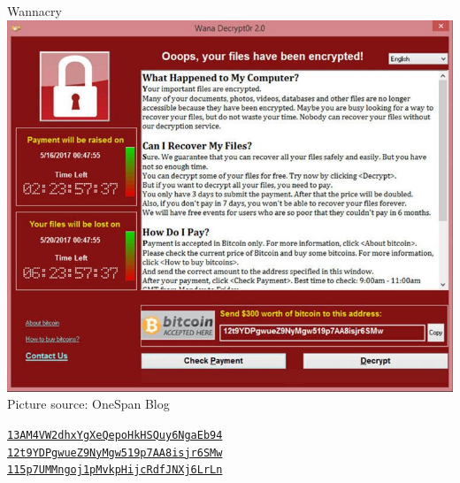 \documentclass[handout]{beamer}
\begin{document}
\begin{frame}{Wannacry}
	\centering
		\includegraphics[scale=0.28]{../assets/images/wannacry} \\
		\footnotesize{Picture source: OneSpan Blog}\\
		\vspace{1em}
		\begin{small}
			\href{https://blockstream.info/address/13AM4VW2dhxYgXeQepoHkHSQuy6NgaEb94}{\texttt{13AM4VW2dhxYgXeQepoHkHSQuy6NgaEb94} \link} \\
			\href{https://blockstream.info/address/12t9YDPgwueZ9NyMgw519p7AA8isjr6SMw}{\texttt{12t9YDPgwueZ9NyMgw519p7AA8isjr6SMw} \link} \\
			\href{https://blockstream.info/address/115p7UMMngoj1pMvkpHijcRdfJNXj6LrLn} {\texttt{115p7UMMngoj1pMvkpHijcRdfJNXj6LrLn} \link} \\
		\end{small}
\end{frame}
\end{document}
